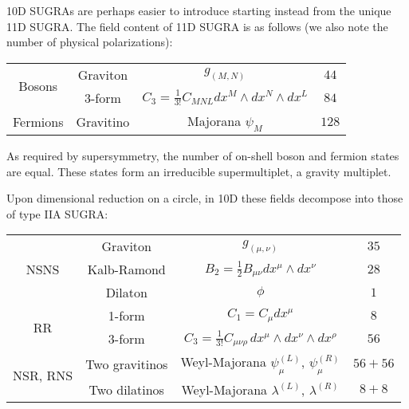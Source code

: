 10D SUGRAs are perhaps easier to introduce starting instead from the unique 11D SUGRA. The field content of 11D SUGRA is as follows (we also note the number of physical polarizations):



\begin{center}
	\begin{tabular}{|c|c|c|c|}
		\hline
		\multirow{2}{*}{Bosons} &
		Graviton	& $g_{(M,N)}$ 							& $44$\\
		&3-form		& $C_3 = \frac{1}{3!} C_{MNL} dx^M \wedge dx^N \wedge dx^L$	& $84$\\
		\hline \hline 
		
		Fermions & Gravitino	& Majorana $\psi_M$ 						& $128$\\
		\hline
	\end{tabular}
\end{center}

As required by supersymmetry, the number of on-shell boson and fermion states are equal. These states form an irreducible supermultiplet, a gravity multiplet.

Upon dimensional reduction on a circle, in 10D these fields decompose into those of type IIA SUGRA:

%

\begin{center}
	\begin{tabular}{|c|c|c|c|}
		\hline
		\multirow{3}{*}{NSNS} 
	&	Graviton	& $g_{(\mu,\nu)}$ 							& $35$\\
	&	Kalb-Ramond	& $B_2 = \frac{1}{2} B_{\mu\nu} dx^\mu \wedge dx^\nu$ & $28$ \\
	&	Dilaton & $\phi$ & $1$ \\
		\hline \hline
		\multirow{2}{*}{RR} 
	&	1-form		& $C_1 = C_{\mu} dx^\mu$ & $8$\\
	&	3-form		& $C_3 = \frac{1}{3!} C_{\mu\nu\rho} \, dx^\mu \wedge dx^\nu \wedge dx^\rho$ & $56$\\
		\hline \hline 
		\multirow{2}{*}{NSR, RNS}
	&	Two gravitinos	& Weyl-Majorana $\psi_\mu^{(L)}$, $\psi_\mu^{(R)}$ 	& $56+56$\\
	&	Two dilatinos	& Weyl-Majorana $\lambda^{(L)}$, $\lambda^{(R)}$ 	& $8+8$\\
		\hline
	\end{tabular}
\end{center}

